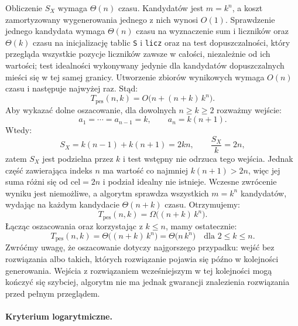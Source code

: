 \documentclass[11pt]{article}
\begin{document}
Obliczenie \(S_X\) wymaga \(\Theta(n)\) czasu. Kandydatów jest \(m=k^n\), a koszt zamortyzowany wygenerowania jednego z nich wynosi \(O(1)\). Sprawdzenie jednego kandydata wymaga \(\Theta(n)\) czasu na wyznaczenie sum i liczników oraz \(\Theta(k)\) czasu na inicjalizację tablic \texttt{S} i \texttt{licz} oraz na test dopuszczalności, który przegląda wszystkie pozycje liczników zawsze w całości, niezależnie od ich wartości; test idealności wykonywany jedynie dla kandydatów dopuszczalnych mieści się w tej samej granicy. Utworzenie zbiorów wynikowych wymaga \(O(n)\) czasu i następuje najwyżej raz. Stąd:
\begin{equation}
T_{\mathrm{pes}}(n,k)=O\bigl(n+(n+k)\,k^n\bigr).
\end{equation}
Aby wykazać dolne oszacowanie, dla dowolnych \(n\geq k\geq2\) rozważmy wejście:
\begin{equation}
a_1=\cdots=a_{n-1}=k, \qquad a_n=k(n+1).
\end{equation}
Wtedy:
\begin{equation}
S_X=k(n-1)+k(n+1)=2kn, \qquad \frac{S_X}{k}=2n,
\end{equation}
zatem \(S_X\) jest podzielna przez \(k\) i test wstępny nie odrzuca tego wejścia. Jednak część zawierająca indeks \(n\) ma wartość co najmniej \(k(n+1)>2n\), więc jej suma różni się od \(\mathrm{cel}=2n\) i podział idealny nie istnieje. Wczesne zwrócenie wyniku jest niemożliwe, a algorytm sprawdza wszystkich \(m=k^n\) kandydatów, wydając na każdym kandydacie \(\Theta(n+k)\) czasu. Otrzymujemy:
\begin{equation}
T_{\mathrm{pes}}(n,k)=\Omega\bigl((n+k)\,k^n\bigr).
\end{equation}
Łącząc oszacowania oraz korzystając z \(k\leq n\), mamy ostatecznie:
\begin{equation}
\boxed{T_{\mathrm{pes}}(n,k)=\Theta\bigl((n+k)\,k^n\bigr)=\Theta\bigl(n\,k^n\bigr)\quad\text{dla }2\leq k\leq n.}
\end{equation}
Zwróćmy uwagę, że oszacowanie dotyczy najgorszego przypadku: wejść bez rozwiązania albo takich, których rozwiązanie pojawia się późno w kolejności generowania. Wejścia z rozwiązaniem wcześniejszym w tej kolejności mogą kończyć się szybciej, algorytm nie ma jednak gwarancji znalezienia rozwiązania przed pełnym przeglądem.

\paragraph{Kryterium logarytmiczne.}
\end{document}
